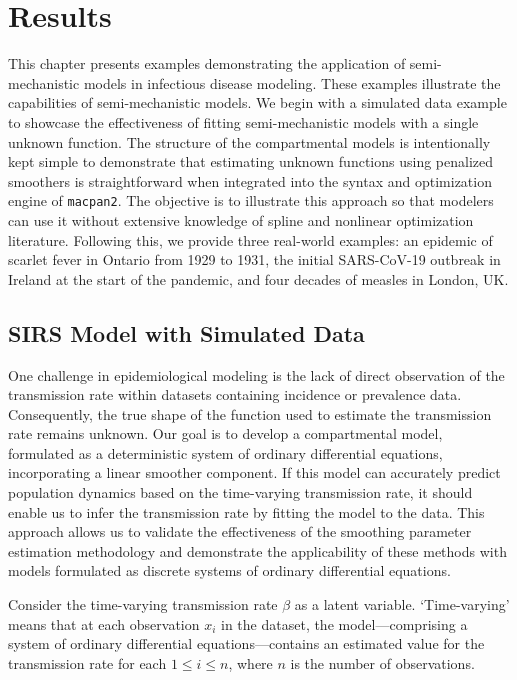 \documentclass[
11pt, %
oneside, %
english, %
singlespacing, %
]{macthesis} %
\begin{document}
\chapter{Results}\label{Results}

This chapter presents examples demonstrating the application of semi-mechanistic models in infectious disease modeling. These examples illustrate the capabilities of semi-mechanistic models. We begin with a simulated data example to showcase the effectiveness of fitting semi-mechanistic models with a single unknown function. The structure of the compartmental models is intentionally kept simple to demonstrate that estimating unknown functions using penalized smoothers is straightforward when integrated into the syntax and optimization engine of \texttt{macpan2}. The objective is to illustrate this approach so that modelers can use it without extensive knowledge of spline and nonlinear optimization literature. Following this, we provide three real-world examples: an epidemic of scarlet fever in Ontario from 1929 to 1931, the initial SARS-CoV-19 outbreak in Ireland at the start of the pandemic, and four decades of measles in London, UK.

\section{SIRS Model with Simulated Data}\label{simulation}

One challenge in epidemiological modeling is the lack of direct observation of the transmission rate within datasets containing incidence or prevalence data. Consequently, the true shape of the function used to estimate the transmission rate remains unknown. Our goal is to develop a compartmental model, formulated as a deterministic system of ordinary differential equations, incorporating a linear smoother component. If this model can accurately predict population dynamics based on the time-varying transmission rate, it should enable us to infer the transmission rate by fitting the model to the data. This approach allows us to validate the effectiveness of the smoothing parameter estimation methodology and demonstrate the applicability of these methods with models formulated as discrete systems of ordinary differential equations.

Consider the time-varying transmission rate \(\beta\) as a latent variable. `Time-varying' means that at each observation \(x_i\) in the dataset, the model---comprising a system of ordinary differential equations---contains an estimated value for the transmission rate for each \(1 \leq i \leq n\), where \(n\) is the number of observations.
\end{document}
